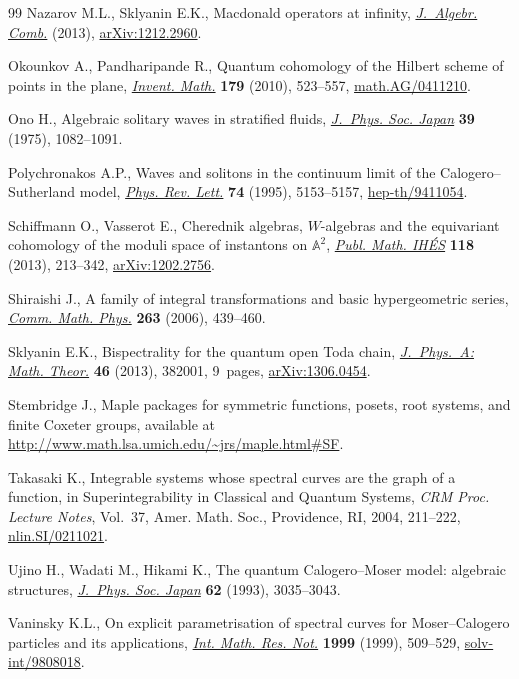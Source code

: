 \documentclass[pdftex]{sigma}
\numberwithin{equation}{section}
\begin{document}
\begin{thebibliography}{99}
Nazarov M.L., Sklyanin E.K., Macdonald operators at inf\/inity,
  \href{http://dx.doi.org/10.1007/s10801-013-0477-2}{\textit{J.~Algebr. Comb.}} (2013), \href{http://arxiv.org/abs/1212.2960}{arXiv:1212.2960}.

Okounkov A., Pandharipande R., Quantum cohomology of the {H}ilbert scheme of
  points in the plane, \href{http://dx.doi.org/10.1007/s00222-009-0223-5}{\textit{Invent. Math.}} \textbf{179} (2010), 523--557,
  \href{http://arxiv.org/abs/math.AG/0411210}{math.AG/0411210}.

Ono H., Algebraic solitary waves in stratif\/ied f\/luids, \href{http://dx.doi.org/10.1143/JPSJ.39.1082}{\textit{J.~Phys. Soc.
  Japan}} \textbf{39} (1975), 1082--1091.

Polychronakos A.P., Waves and solitons in the continuum limit of the
  {C}alogero--{S}utherland model, \href{http://dx.doi.org/10.1103/PhysRevLett.74.5153}{\textit{Phys. Rev. Lett.}} \textbf{74} (1995),
  5153--5157, \href{http://arxiv.org/abs/hep-th/9411054}{hep-th/9411054}.

Schif\/fmann O., Vasserot E., Cherednik algebras, $W$-algebras and the
  equivariant cohomology of the moduli space of instantons on $\mathbb{A}^2$,
  \href{http://dx.doi.org/10.1007/s10240-013-0052-3}{\textit{Publ. Math. IH\'ES}} \textbf{118} (2013), 213--342,
  \href{http://arxiv.org/abs/1202.2756}{arXiv:1202.2756}.

Shiraishi J., A family of integral transformations and basic hypergeometric
  series, \href{http://dx.doi.org/10.1007/s00220-005-1504-5}{\textit{Comm. Math. Phys.}} \textbf{263} (2006), 439--460.

Sklyanin E.K., Bispectrality for the quantum open Toda chain,
  \href{http://dx.doi.org/10.1088/1751-8113/46/38/382001}{\textit{J.~Phys.~A: Math. Theor.}} \textbf{46} (2013), 382001, 9~pages,
  \href{http://arxiv.org/abs/1306.0454}{arXiv:1306.0454}.

Stembridge J., Maple packages for symmetric functions, posets, root systems,
  and f\/inite Coxeter groups, available at
  \url{http://www.math.lsa.umich.edu/~jrs/maple.html\#SF}.

Takasaki K., Integrable systems whose spectral curves are the graph of a
  function, in Superintegrability in Classical and Quantum Systems, \textit{CRM
  Proc. Lecture Notes}, Vol.~37, Amer. Math. Soc., Providence, RI, 2004,
  211--222, \href{http://arxiv.org/abs/nlin.SI/0211021}{nlin.SI/0211021}.

Ujino H., Wadati M., Hikami K., The quantum {C}alogero--{M}oser model:
  algebraic structures, \href{http://dx.doi.org/10.1143/JPSJ.62.3035}{\textit{J.~Phys. Soc. Japan}} \textbf{62} (1993),
  3035--3043.

Vaninsky K.L., On explicit parametrisation of spectral curves for
  {M}oser--{C}alogero particles and its applications, \href{http://dx.doi.org/10.1155/S1073792899000264}{\textit{Int. Math. Res.
  Not.}} \textbf{1999} (1999), 509--529, \href{http://arxiv.org/abs/solv-int/9808018}{solv-int/9808018}.

\end{thebibliography}\LastPageEnding
\end{document}
